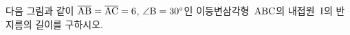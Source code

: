 다음 그림과 같이 $\overline{\mathrm{AB}}=\overline{\mathrm{AC}}=6$, $\angle\mathrm{B}=30^\circ$인 이등변삼각형~$\mathrm{ABC}$의 내접원~$\mathrm{I}$의 반지름의 길이를 구하시오.
\par\smallskip\begin{center}\resizebox{\ifdim\width>\linewidth\linewidth\else\width\fi}{!}{}\end{center}
